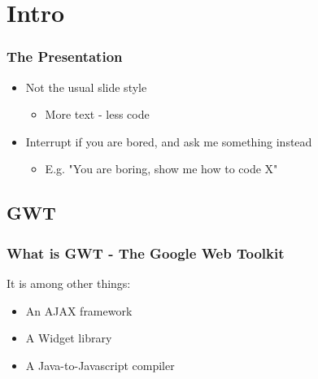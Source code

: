 \section{Intro} %

\begin{frame}[red] %
\frametitle{The Presentation}


\begin{itemize}
\item Not the usual slide style
\begin{itemize}\item More text - less code \end{itemize}
\item Interrupt if you are bored, and ask me something instead
\begin{itemize}\item E.g. "You are boring, show me how to code X" \end{itemize}
\end{itemize}







\end{frame}


\subsection{GWT} %

\begin{frame}[red] %
\frametitle{What is GWT - The Google Web Toolkit}

It is among other things:

\begin{itemize}
\item An AJAX framework
\item A Widget library
\item A Java-to-Javascript compiler
\end{itemize}

\end{frame}

